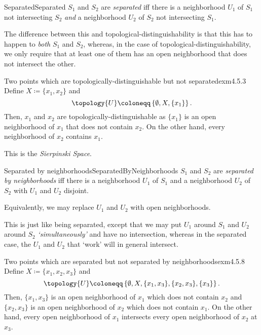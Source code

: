 \begin{dfn}{Separated}{Separated}
$S_1$ and $S_2$ are \emph{separated} iff there is a neighborhood $U_1$ of $S_1$ not intersecting $S_2$ \emph{and} a neighborhood $U_2$ of $S_2$ not intersecting $S_1$.
\begin{rmk}
The difference between this and topological-distinguishability is that this has to happen to \emph{both} $S_1$ and $S_2$, whereas, in the case of topological-distinguishability, we only require that at least one of them has an open neighborhood that does not intersect the other.
\end{rmk}
\end{dfn}
\begin{exm}{Two points which are topolo\-gically-distinguish\-able but not separated}{exm4.5.3}
Define $X\coloneqq \{ x_1,x_2\}$ and
\begin{equation}
\topology{U}\coloneqq \left\{ \emptyset ,X,\{ x_1\} \right\} .
\end{equation}
Then, $x_1$ and $x_2$ are topologically-distinguishable as $\{ x_1\}$ is an open neighborhood of $x_1$ that does not contain $x_2$.  On the other hand, every neighborhood of $x_2$ contains $x_1$.
\begin{rmk}
This is the \emph{Sierpinski Space}.
\end{rmk}
\end{exm}
\begin{dfn}{Separated by neighborhoods}{SeparatedByNeighborhoods}
$S_1$ and $S_2$ are \emph{separated by neighborhoods} iff there is a neighborhood $U_1$ of $S_1$ and a neighborhood $U_2$ of $S_2$ with $U_1$ and $U_2$ disjoint.
\begin{rmk}
Equivalently, we may replace $U_1$ and $U_2$ with open neighborhoods.
\end{rmk}
\begin{rmk}
This is just like being separated, except that we may put $U_1$ around $S_1$ and $U_2$ around $S_2$ \emph{`simultaneously'} and have no intersection, whereas in the separated case, the $U_1$ and $U_2$ that `work' will in general intersect.
\end{rmk}
\end{dfn}
\begin{exm}{Two points which are separated but not separated by neighborhoods}{exm4.5.8}
Define $X\coloneqq \{ x_1,x_2,x_3\}$ and
\begin{equation}
\topology{U}\coloneqq \left\{ \emptyset ,X,\{ x_1,x_3\} ,\{ x_2,x_3\} ,\{ x_3\} \right\} .
\end{equation}
Then, $\{ x_1,x_3\}$ is an open neighborhood of $x_1$ which does not contain $x_2$ and $\{ x_2,x_3\}$ is an open neighborhood of $x_2$ which does not contain $x_1$.  On the other hand, every open neighborhood of $x_1$ intersects every open neighborhood of $x_2$ at $x_3$.
\end{exm}

